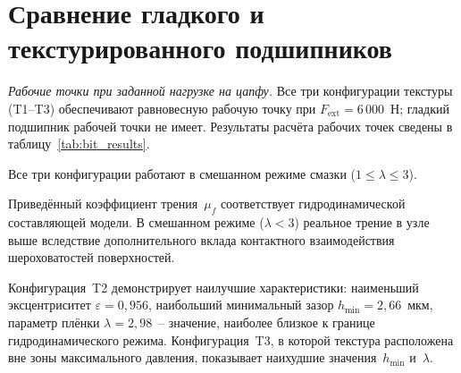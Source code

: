 \section{Сравнение гладкого и текстурированного подшипников}

\textit{Рабочие точки при заданной нагрузке на цапфу.}
Все три конфигурации текстуры (T1--T3) обеспечивают равновесную
рабочую точку при $F_{\mathrm{ext}} = 6\,000$~Н; гладкий
подшипник рабочей точки не имеет. Результаты расчёта рабочих точек
сведены в таблицу~\ref{tab:bit_results}.

\begin{table}[!ht]
\centering
\caption{Характеристики подшипника в рабочей точке
  при $F_{\mathrm{ext}} = 6\,000$~Н}
\label{tab:bit_results}
\end{table}

\FloatBarrier

Все три конфигурации работают в смешанном режиме смазки
($1 \leq \lambda \leq 3$).

Приведённый коэффициент трения~$\mu_f$ соответствует
гидродинамической составляющей модели. В смешанном режиме
($\lambda < 3$) реальное трение в узле выше вследствие
дополнительного вклада контактного взаимодействия шероховатостей
поверхностей.

Конфигурация~T2 демонстрирует наилучшие характеристики:
наименьший эксцентриситет $\varepsilon = 0{,}956$, наибольший
минимальный зазор $h_{\min} = 2{,}66$~мкм, параметр плёнки
$\lambda = 2{,}98$~-- значение, наиболее близкое к границе
гидродинамического режима. Конфигурация~T3, в которой текстура
расположена вне зоны максимального давления, показывает наихудшие
значения~$h_{\min}$ и~$\lambda$.


